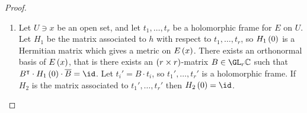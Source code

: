 \pagebreak

\begin{proof}
\hfill
\begin{enumerate}
\item Let $ U \ni x $ be an open set, and let $ t_1, \dots, t_r $ be a holomorphic frame for $ E $ on $ U $. Let $ H_1 $ be the matrix associated to $ h $ with respect to $ t_1, \dots, t_r $, so $ H_1\br{0} $ is a Hermitian matrix which gives a metric on $ E\br{x} $. There exists an orthonormal basis of $ E\br{x} $, that is there exists an $ \br{r \times r} $-matrix $ B \in \GL_r \CC $ such that $ B^\intercal \cdot H_1\br{0} \cdot \overline{B} = \id $. Let $ t_i' = B \cdot t_i $, so $ t_1', \dots, t_r' $ is a holomorphic frame. If $ H_2 $ is the matrix associated to $ t_1', \dots, t_r' $ then $ H_2\br{0} = \id $.
\end{enumerate}
\end{proof}

